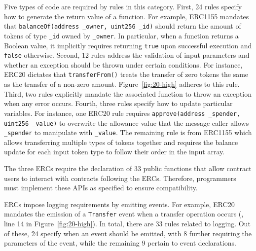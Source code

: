 Five types of code are required by rules in this category.
First, 24 rules specify how to generate the return value of a function. 
For example, ERC1155 mandates that \texttt{balanceOf(address \_owner, uint256 \_id)} should return the amount of tokens of type \texttt{\_id} 
owned by \texttt{\_owner}. 
In particular, when a
function returns a Boolean value, 
it implicitly requires returning \texttt{true} upon successful 
execution and \texttt{false} otherwise.
Second, 12 rules address the validation of input parameters 
and whether an exception should be 
thrown under certain conditions. 
For instance, ERC20 dictates that \texttt{transferFrom()} treats 
the transfer of zero tokens the same as the transfer of a non-zero amount. 
Figure~\ref{fig:20-high} adheres to this rule. 
Third, two rules explicitly mandate the associated function to 
throw an exception when any error occurs. 
Fourth, three rules specify how to update particular variables. 
For instance, one ERC20 rule requires \texttt{approve(address \_spender, uint256 \_value)} to overwrite the 
allowance value that the message caller allows \texttt{\_spender} to
manipulate with \texttt{\_value}. The remaining rule is from 
ERC1155 which allows transferring multiple types of tokens together  
and requires the balance update for each input token type to 
follow their order in the input array.




The three ERCs require the declaration of 33 public functions 
that allow contract users to interact with contracts following the ERCs. 
Therefore, programmers must implement these APIs as specified to ensure compatibility.
 



ERCs impose logging requirements by emitting events. 
For example, ERC20 mandates the emission of a \texttt{Transfer} event 
when a transfer operation occurs (\eg, line 14 in Figure~\ref{fig:20-high}). 
In total, there are 33 rules related to logging. 
Out of these, 24 specify when an event should be emitted, 
with 8 further requiring the parameters of the event, 
while the remaining 9 pertain to event declarations.





